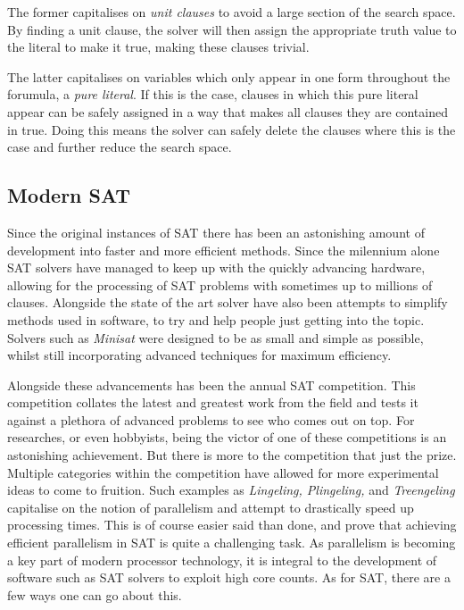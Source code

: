 \documentclass{article}
\begin{document}
The former capitalises on \textit{unit clauses} to avoid a large section of the search space. By finding a unit clause, the 
solver will then assign the appropriate truth value to the literal to make it true, making these clauses trivial.

The latter capitalises on variables which only appear in one form throughout the forumula, a \textit{pure literal}. If this is 
the case, clauses in which this pure literal appear can be safely assigned in a way that makes all clauses they are contained in 
true. Doing this means the solver can safely delete the clauses where this is the case and further reduce the search space.

\subsection{Modern SAT}
Since the original instances of SAT there has been an astonishing amount of development into
faster and more efficient methods. Since the milennium alone SAT solvers have managed to keep up
with the quickly advancing hardware, allowing for the processing of SAT problems with sometimes up
to millions of clauses. Alongside the state of the art solver have also been attempts to simplify
methods used in software, to try and help people just getting into the topic. Solvers such as
\textit{Minisat} were designed to be as small and simple as possible, whilst still incorporating
advanced techniques for maximum efficiency.

Alongside these advancements has been the annual SAT competition. This competition collates the
latest and greatest work from the field and tests it against a plethora of advanced problems to see
who comes out on top. For researches, or even hobbyists, being the victor of one of these
competitions is an astonishing achievement. But there is more to the competition that just the
prize. Multiple categories within the competition have allowed for more experimental ideas to come
to fruition. Such examples as \textit{Lingeling, Plingeling,} and \textit{Treengeling} capitalise on
the notion of parallelism and attempt to drastically speed up processing times. This is of course
easier said than done, and prove that achieving efficient parallelism in SAT is quite a challenging
task. As parallelism is becoming a key part of modern processor technology, it is integral to the
development of software such as SAT solvers to exploit high core counts. As for SAT, there are a few
ways one can go about this.
\end{document}

